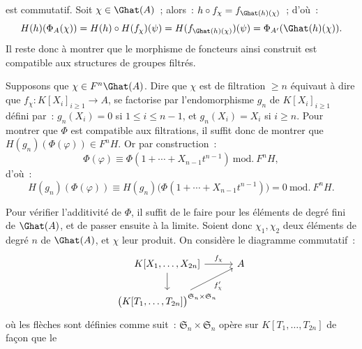est
commutatif. Soit \(\chi\in\Ghat(A)\)~; alors~: \(h\circ f_\chi=f_{\Ghat(h)(\chi)}\)~; d'où~:
\[
  H(h)(\Phi_A(\chi))=H(h)\circ H(f_\chi)(\psi)
  =H(f_{\Ghat(h)(\chi)})(\psi)=\Phi_{A'}(\Ghat(h)(\chi)).
\]
Il reste donc à montrer que le morphisme de foncteurs ainsi construit est compatible aux structures de groupes filtrés.

Supposons que \(\chi\in F^n\Ghat(A)\). Dire que \(\chi\) est de filtration \(\geq n\) équivaut à dire que \(f_\chi:K[X_i]_{i\geq 1}\to A\), se factorise par l'endomorphisme \(g_n\) de \(K[X_i]_{i\geq 1}\) défini par~: \(g_n(X_i)=0\) si \(1\leq i\leq n-1\), et \(g_n(X_i)=X_i\) si \(i\geq n\).
Pour montrer que \(\Phi\) est compatible aux filtrations, il suffit donc de montrer que \(H(g_n)(\Phi(\varphi))\in F^nH\). Or par construction~:
\[
  \Phi(\varphi)\equiv \Phi(1+\cdots+X_{n-1}t^{n-1})\ \mathrm{mod.}\ F^nH,
\]
d'où~:
\[
  H(g_n)(\Phi(\varphi))
  \equiv H(g_n)\bigl(\Phi(1+\cdots+X_{n-1}t^{n-1})\bigr)
  =0\ \mathrm{mod.}\ F^nH.
\]

Pour vérifier l'additivité de \(\Phi\), il suffit de le faire pour les éléments de degré fini de \(\Ghat(A)\), et de passer ensuite à la limite. Soient donc \(\chi_1,\chi_2\) deux éléments de degré \(n\) de \(\Ghat(A)\), et \(\chi\) leur produit. On considère le diagramme commutatif~:
\[
\begin{tikzcd}[column sep=tiny]
K[X_1,\ldots,X_{2n}] \arrow[rr,"f_\chi"] \arrow[d] && A\\
\bigl(K[T_1,\ldots,T_{2n}]\bigr)^{\mathfrak S_n\times\mathfrak S_n}
\arrow[urr,"f'_\chi"'] &&
\end{tikzcd}
\]
où les flèches sont définies comme suit~: \(\mathfrak S_n\times\mathfrak S_n\) opère sur \(K[T_1,\ldots,T_{2n}]\) de façon que le
